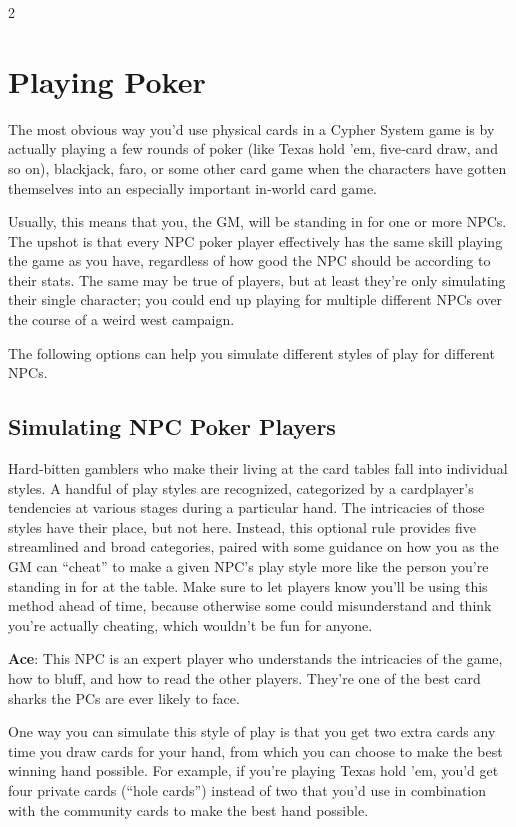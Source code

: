 \begin{multicols}{2}

\chapter{Playing Poker}
The most obvious way you’d use physical cards in a Cypher System game is by actually playing a few rounds of poker (like Texas hold ’em, five‑card draw, and so on), blackjack, faro, or some other card game when the characters have gotten themselves into an especially important in‑world card game. 

Usually, this means that you, the GM, will be standing in for one or more NPCs. The upshot is that every NPC poker player effectively has the same skill playing the game as you have, regardless of how good the NPC should be according to their stats. The same may be true of players, but at least they’re only simulating their single character; you could end up playing for multiple different NPCs over the course of a weird west campaign. 

The following options can help you simulate different styles of play for different NPCs.

\section{Simulating NPC Poker Players}
 
Hard‑bitten gamblers who make their living at the card tables fall into individual styles. A handful of play styles are recognized, categorized by a cardplayer’s tendencies at various stages during a particular hand. The intricacies of those styles have their place, but not here. Instead, this optional rule provides five streamlined and broad categories, paired with some guidance on how you as the GM can “cheat” to make a given NPC’s play style more like the person you’re standing in for at the table. Make sure to let players know you’ll be using this method ahead of time, because otherwise some could misunderstand and think you’re actually cheating, which wouldn’t be fun for anyone.

\textbf{Ace}: This NPC is an expert player who understands the intricacies of the game, how to bluff, and how to read the other players. They’re one of the best card sharks the PCs are ever likely to face. 

One way you can simulate this style of play is that you get two extra cards any time you draw cards for your hand, from which you can choose to make the best winning hand possible. For example, if you’re playing Texas hold ’em, you’d get four private cards (“hole cards”) instead of two that you’d use in combination with the community cards to make the best hand possible.


\end{multicols}
